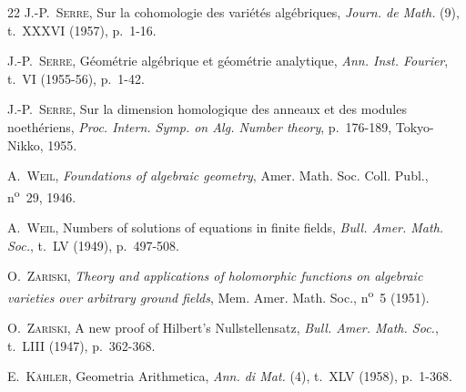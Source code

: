 \begin{thebibliography}{22}
J.-P.~\textsc{Serre},
Sur la cohomologie des variétés algébriques,
\emph{Journ. de Math.} (9), t.~XXXVI (1957), p.~1-16.

J.-P.~\textsc{Serre},
Géométrie algébrique et géométrie analytique,
\emph{Ann. Inst. Fourier}, t.~VI (1955-56), p.~1-42.

J.-P.~\textsc{Serre},
Sur la dimension homologique des anneaux et des modules noethériens,
\emph{Proc. Intern. Symp. on Alg. Number theory}, p.~176-189, Tokyo-Nikko,
1955.

A.~\textsc{Weil}, \emph{Foundations of algebraic geometry}, Amer. Math. Soc.
Coll. Publ., n\textsuperscript{o}~29, 1946.

A.~\textsc{Weil}, Numbers of solutions of equations in finite fields,
\emph{Bull. Amer. Math. Soc.}, t.~LV (1949), p.~497-508.

O.~\textsc{Zariski},
\emph{Theory and applications of holomorphic functions on algebraic varieties
over arbitrary ground fields}, Mem. Amer. Math. Soc., n\textsuperscript{o}~5
(1951).

O.~\textsc{Zariski}, A new proof of Hilbert's Nullstellensatz,
\emph{Bull. Amer. Math. Soc.}, t.~LIII (1947), p.~362-368.

E.~\textsc{Kähler}, Geometria Arithmetica,
\emph{Ann. di Mat.} (4), t.~XLV (1958), p.~1-368.

\end{thebibliography}
